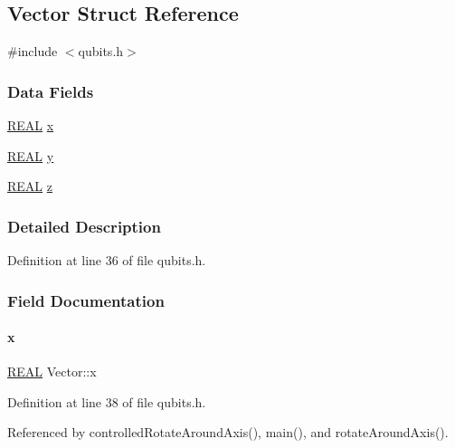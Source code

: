 \hypertarget{structVector}{}\subsection{Vector Struct Reference}
\label{structVector}


{\ttfamily \#include $<$qubits.\+h$>$}

\subsubsection*{Data Fields}
\begin{DoxyCompactItemize}
\item 
\mbox{\hyperlink{precision_8h_a4b654506f18b8bfd61ad2a29a7e38c25}{R\+E\+AL}} \mbox{\hyperlink{structVector_aac7abe171ba4bada50ed72acba6259fc}{x}}
\item 
\mbox{\hyperlink{precision_8h_a4b654506f18b8bfd61ad2a29a7e38c25}{R\+E\+AL}} \mbox{\hyperlink{structVector_a375ca805d4c808a53d7c4e0c737ae3de}{y}}
\item 
\mbox{\hyperlink{precision_8h_a4b654506f18b8bfd61ad2a29a7e38c25}{R\+E\+AL}} \mbox{\hyperlink{structVector_ad4e863651be7d6b7e2b28cd7445a0ccf}{z}}
\end{DoxyCompactItemize}


\subsubsection{Detailed Description}


Definition at line 36 of file qubits.\+h.



\subsubsection{Field Documentation}
\mbox{\label{structVector_aac7abe171ba4bada50ed72acba6259fc}} 
\paragraph{\texorpdfstring{x}{x}}
{\footnotesize\ttfamily \mbox{\hyperlink{precision_8h_a4b654506f18b8bfd61ad2a29a7e38c25}{R\+E\+AL}} Vector\+::x}



Definition at line 38 of file qubits.\+h.



Referenced by controlled\+Rotate\+Around\+Axis(), main(), and rotate\+Around\+Axis().

